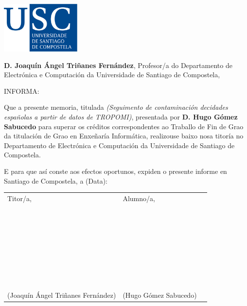 \pagestyle{plain}
\includegraphics[width=4cm]{figuras/logo_usc.eps}

\vspace{1cm}
{\bf D. Joaquín Ángel Triñanes Fernández}, Profesor/a do Departamento de Electrónica e Computación da Universidade de Santiago de Compostela,

\vspace{1cm}
INFORMA:

\vspace{1cm}
Que a presente memoria, titulada {\it (Seguimento de contaminación decidades españolas a partir de datos de TROPOMI)}, presentada por {\bf D. Hugo Gómez Sabucedo} para superar os créditos correspondentes ao Traballo de Fin de Grao da titulación de Grao en Enxeñaría Informática, realizouse baixo nosa titoría no Departamento de Electrónica e Computación da Universidade de Santiago de Compostela.

\vspace{1cm}
E para que así conste aos efectos oportunos, expiden o presente informe en Santiago de Compostela, a (Data):

\vspace{2cm}
\begin{tabular}{lll}
	Titor/a, & Alumno/a, \\
	~ \\
	~ \\
	~ \\
	~ \\
	~ \\
	~ \\
	~ \\
	(Joaquín Ángel Triñanes Fernández) & (Hugo Gómez Sabucedo)
\end{tabular}

